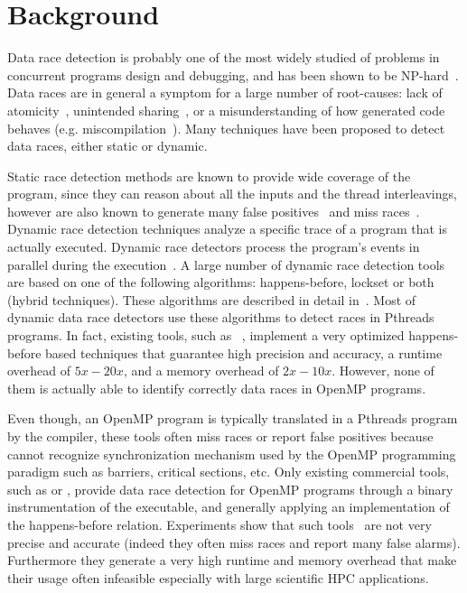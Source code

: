 \section{Background}
\label{sec:background}

Data race detection is probably one of the most widely studied of problems in
concurrent programs design and debugging, and has been shown to be
NP-hard~\cite{netzer-miller}.
%
Data races are in general a symptom for a large number of root-causes: lack
of atomicity~\cite{usenix-race-erickson-et-al}, unintended
sharing~\cite{race-rv-2012-talk}, or a misunderstanding of how generated code
behaves (e.g. miscompilation~\cite{Boehm:2011:MPB:2001252.2001255}).
%
Many techniques have been proposed to detect data races, either static or
dynamic.

Static race detection methods are known to provide wide coverage of the
program, since they can reason about all the inputs and the thread
interleavings, however are also known to generate many false
positives~\cite{Pratikakis:2011:LPS:1889997.1890000} and miss
races~\cite{Voung:2007:RSR:1287624.1287654}.
%
Dynamic race detection techniques analyze a specific trace of a program
that is actually executed.
%
Dynamic race detectors process the program’s events in parallel during the
execution~\cite{Lamport:1978:TCO:359545.359563, Savage:1997:EDD:269005.266641,
  Flanagan:2009, tsan}.
%
A large number of dynamic race detection tools are based on one of the
following algorithms: happens-before, lockset or both (hybrid techniques).
%
These algorithms are described in detail
in~\cite{O'Callahan:2003:HDD:966049.781528}.
%
Most of dynamic data race detectors use these algorithms to detect races in
Pthreads programs.
%
In fact, existing tools, such as \tsan~\cite{tsan}, implement a very optimized
happens-before based techniques that guarantee high precision and accuracy, a
runtime overhead of $5x-20x$, and a memory overhead of $2x-10x$.
%
However, none of them is actually able to identify correctly data races in OpenMP
programs.

Even though, an OpenMP program is typically translated in a Pthreads program
by the compiler, these tools often miss races or report false positives
because cannot recognize synchronization mechanism used by the OpenMP
programming paradigm such as barriers, critical sections, etc.
%
Only existing commercial tools, such as \insp or \sun, provide data race
detection for OpenMP programs through a binary instrumentation of the
executable, and generally applying an implementation of the happens-before
relation.
%
Experiments show that such tools~\cite{Protze:2014:TPL:2688361.2688369} are
not very precise and accurate (indeed they often miss races and report many
false alarms).
%
Furthermore they generate a very high runtime and memory overhead that make
their usage often infeasible especially with large scientific HPC
applications.

